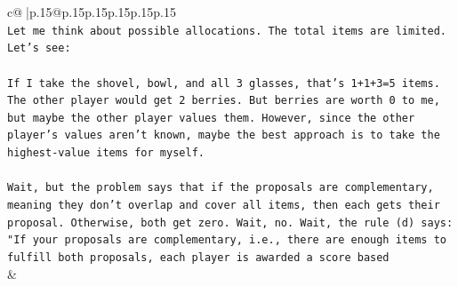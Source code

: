 \documentclass{article}
\begin{document}
{\begin{supertabular}{c@{$\;$}|p{.15\linewidth}@{}p{.15\linewidth}p{.15\linewidth}p{.15\linewidth}p{.15\linewidth}p{.15\linewidth}}
{{{\\ 
\texttt{Let me think about possible allocations. The total items are limited. Let's see:} \\
\\ 
\texttt{If I take the shovel, bowl, and all 3 glasses, that's 1+1+3=5 items. The other player would get 2 berries. But berries are worth 0 to me, but maybe the other player values them. However, since the other player's values aren't known, maybe the best approach is to take the highest{-}value items for myself.} \\
\\ 
\texttt{Wait, but the problem says that if the proposals are complementary, meaning they don't overlap and cover all items, then each gets their proposal. Otherwise, both get zero. Wait, no. Wait, the rule (d) says: "If your proposals are complementary, i.e., there are enough items to fulfill both proposals, each player is awarded a score based} \\
            }
        }
    }
    & \\ \\


\end{supertabular}}
\end{document}
